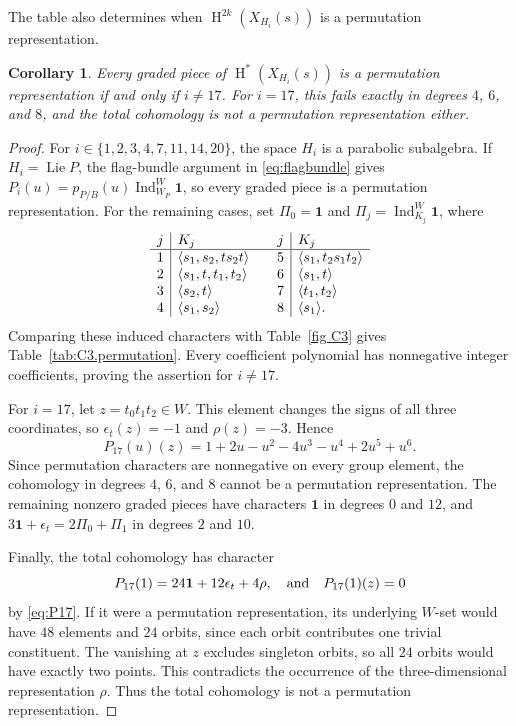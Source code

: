 \documentclass[11pt]{amsart}
\numberwithin{equation}{section}
\newtheorem{corollary}[theorem]{Corollary}
\theoremstyle{definition}
\def\and{\quad{\rm and}\quad}
\def\beq{\begin{equation}}
\def\eeq{\end{equation}}
\DeclareMathOperator{\Ind}{\mathrm{Ind}}
\DeclareMathOperator{\coh}{\mathrm{H}}
\begin{document}
\medskip



The table also determines when $\coh^{2k}(X_{H_i}(s))$ is a permutation representation.

\begin{corollary}\label{cor:C3.permutation}
Every graded piece of $\coh^*(X_{H_i}(s))$ is a permutation representation if and only if $i\ne17$.
For $i=17$, this fails exactly in degrees $4$, $6$, and $8$, and the total cohomology is not a permutation representation either.
\end{corollary}

\begin{proof}
For $i\in\{1,2,3,4,7,11,14,20\}$, the space $H_i$ is a parabolic subalgebra. If $H_i=\operatorname{Lie}P$, the flag-bundle argument in \eqref{eq:flagbundle} gives $P_i(u)=p_{P/B}(u)\Ind_{W_P}^{W}\mathbf1$, so every graded piece is a permutation representation.
For the remaining cases, set $\Pi_0=\mathbf1$ and $\Pi_j=\Ind_{K_j}^{W}\mathbf1$, where
\[
\begin{array}{c|l@{\qquad}c|l}
j&K_j&j&K_j\\\hline
1&\langle s_1,s_2,ts_2t\rangle
 &5&\langle s_1,t_2s_1t_2\rangle\\
2&\langle s_1,t,t_1,t_2\rangle
 &6&\langle s_1,t\rangle\\
3&\langle s_2,t\rangle
 &7&\langle t_1,t_2\rangle\\
4&\langle s_1,s_2\rangle
 &8&\langle s_1\rangle.
\end{array}
\]
Comparing these induced characters with Table~\ref{fig C3} gives Table~\ref{tab:C3.permutation}.
Every coefficient polynomial has nonnegative integer coefficients, proving the assertion for $i\ne17$.

For $i=17$, let $z=t_0t_1t_2\in W$.
This element changes the signs of all three coordinates, so $\epsilon_t(z)=-1$ and $\rho(z)=-3$.
Hence
\beq\label{eq:P17}
P_{17}(u)(z)=1+2u-u^2-4u^3-u^4+2u^5+u^6.
\eeq
Since permutation characters are nonnegative on every group element, the cohomology in degrees $4$, $6$, and $8$ cannot be a permutation representation. 
The remaining nonzero graded pieces have characters $\mathbf1$ in degrees $0$ and $12$, and $3\mathbf1+\epsilon_t=2\Pi_0+\Pi_1$ in degrees $2$ and $10$.

Finally, the total cohomology has character 
\[P_{17}(1)=24\mathbf1+12\epsilon_t+4\rho, \and P_{17}(1)(z)=0\]
by \eqref{eq:P17}.
If it were a permutation representation, its underlying $W$-set would have $48$ elements and $24$ orbits, since each orbit contributes one trivial constituent.
The vanishing at $z$ excludes singleton orbits, so all $24$ orbits would have exactly two points.
This contradicts the occurrence of the three-dimensional representation $\rho$.
Thus the total cohomology is not a permutation representation.
\end{proof}
\end{document}
